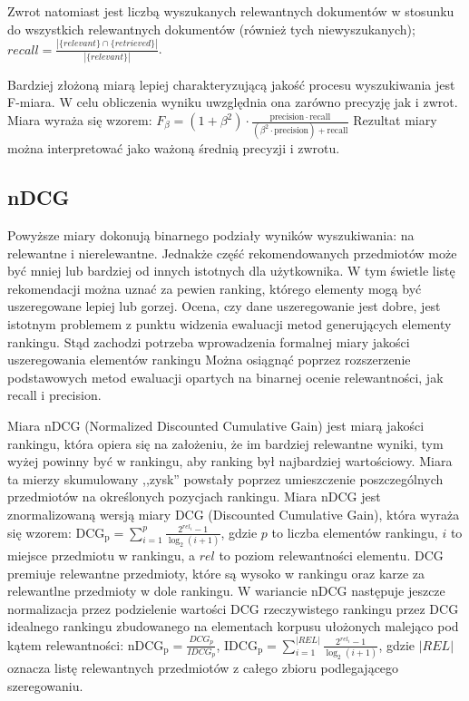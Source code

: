 \documentclass[pl]{minipw} %
\begin{document}
Zwrot natomiast jest liczbą wyszukanych relewantnych dokumentów w stosunku do wszystkich relewantnych dokumentów (również tych niewyszukanych); $recall=\frac{|\{relevant\} \cap \{retrieved\}|}{|\{relevant\}|}$.

Bardziej złożoną miarą lepiej charakteryzującą jakość procesu wyszukiwania jest F-miara. W celu obliczenia wyniku uwzględnia ona zarówno precyzję jak i zwrot. Miara wyraża się wzorem: $F_\beta = (1 + \beta^2) \cdot \frac{\mathrm{precision} \cdot \mathrm{recall}}{(\beta^2 \cdot \mathrm{precision}) + \mathrm{recall}}$ Rezultat miary można interpretować jako ważoną średnią precyzji i zwrotu. 


\subsection{nDCG}
Powyższe miary dokonują binarnego podziały wyników wyszukiwania: na relewantne i nierelewantne. Jednakże część rekomendowanych przedmiotów może być mniej lub bardziej od innych istotnych dla użytkownika. W tym świetle listę rekomendacji można uznać za pewien ranking, którego elementy mogą być uszeregowane lepiej lub gorzej. Ocena, czy dane uszeregowanie jest dobre, jest istotnym problemem z punktu widzenia ewaluacji metod generujących elementy rankingu. Stąd zachodzi potrzeba wprowadzenia formalnej miary jakości uszeregowania elementów rankingu Można osiągnąć poprzez rozszerzenie podstawowych metod ewaluacji opartych na binarnej ocenie relewantności, jak recall i precision.

Miara nDCG\cite{ndcg} (Normalized Discounted Cumulative Gain) jest miarą jakości rankingu, która opiera się na założeniu, że im bardziej relewantne wyniki, tym wyżej powinny być w rankingu, aby ranking był najbardziej wartościowy. Miara ta mierzy skumulowany ,,zysk'' powstały poprzez umieszczenie poszczególnych przedmiotów na określonych pozycjach rankingu. Miara nDCG jest znormalizowaną wersją miary DCG (Discounted Cumulative Gain), która wyraża się wzorem: ${\mathrm  {DCG_{{p}}}}=\sum _{{i=1}}^{{p}}{\frac  {2^{{rel_{{i}}}}-1}{\log _{{2}}(i+1)}}$, gdzie $p$ to liczba elementów rankingu, $i$ to miejsce przedmiotu w rankingu, a $rel$ to poziom relewantności elementu. DCG premiuje relewantne przedmioty, które są wysoko w rankingu oraz karze za relewantlne przedmioty w dole rankingu. W wariancie nDCG następuje jeszcze normalizacja przez podzielenie wartości DCG rzeczywistego rankingu przez DCG idealnego rankingu zbudowanego na elementach korpusu ułożonych malejąco pod kątem relewantności: ${\mathrm  {nDCG_{{p}}}}={\frac  {DCG_{{p}}}{IDCG_{{p}}}}$, $\mathrm {IDCG_{p}} =\sum _{i=1}^{|REL|}{\frac {2^{rel_{i}}-1}{\log _{2}(i+1)}}$, gdzie $|REL|$ oznacza listę relewantnych przedmiotów z całego zbioru podlegającego szeregowaniu.
\end{document}
